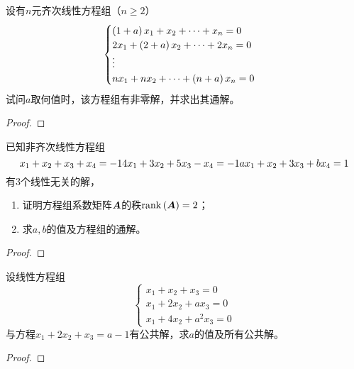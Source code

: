 \begin{problem}\label{problem-2.8}
设有\(n\)元齐次线性方程组（\(n\ge2\)）
\begin{equation*}
    \begin{cases}
        \left( 1+a \right)x_1+x_2+\cdots+x_n=0   \\
        2x_1+\left( 2+a \right)x_2+\cdots+2x_n=0 \\
        \vdots                            \\
        nx_1+nx_2+\cdots+\left( n+a \right)x_n=0
    \end{cases}
\end{equation*}
试问\(a\)取何值时，该方程组有非零解，并求出其通解。
\end{problem}
\begin{proof}
\end{proof}

\begin{problem}\label{problem-2.9}
已知非齐次线性方程组
\begin{equation*}
    x_1+x_2+x_3+x_4=-1\\
    4x_1+3x_2+5x_3-x_4=-1\\
    ax_1+x_2+3x_3+bx_4=1
\end{equation*}
有\(3\)个线性无关的解，
\begin{enumerate}
    \item 证明方程组系数矩阵\(\boldsymbol{A}\)的秩\(\mathrm{rank}\left( \boldsymbol{A} \right)=2\)；
    \item 求\(a,b\)的值及方程组的通解。
\end{enumerate}
\end{problem}
\begin{proof}
\end{proof}

\begin{problem}\label{problem-2.10}
设线性方程组
\begin{equation*}
    \begin{cases}
        x_1+x_2+x_3=0   \\
        x_1+2x_2+ax_3=0 \\
        x_1+4x_2+a^2x_3=0
    \end{cases}
\end{equation*}
与方程\(x_1+2x_2+x_3=a-1\)有公共解，求\(a\)的值及所有公共解。
\end{problem}
\begin{proof}
\end{proof}

